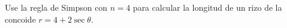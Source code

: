 \item Use la regla de Simpson con $n = 4$ para calcular la longitud de un rizo de la concoide $r = 4 + 2 \sec\theta$.
